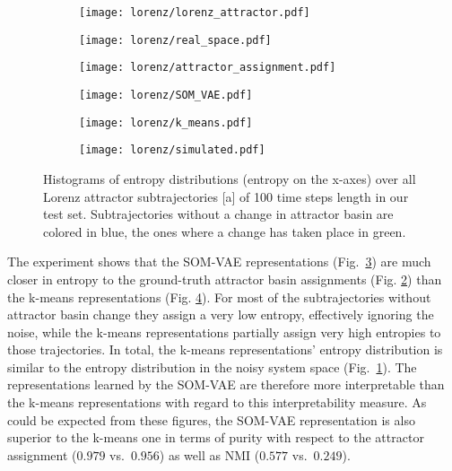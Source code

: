 \begin{figure}[h!]
    \centering
    \begin{subfigure}[t]{0.15\textwidth}
\centering
\texttt{[image: lorenz/lorenz\_attractor.pdf]}
\end{subfigure}
    \begin{subfigure}[t]{0.15\textwidth}
\centering
\texttt{[image: lorenz/real\_space.pdf]}
\label{fig:lorenz_real}
\end{subfigure}
    \begin{subfigure}[t]{0.15\textwidth}
\centering
\texttt{[image: lorenz/attractor\_assignment.pdf]}
\label{fig:lorenz_assignment}
\end{subfigure}
    \begin{subfigure}[t]{0.15\textwidth}
\centering
\texttt{[image: lorenz/SOM\_VAE.pdf]}
\label{fig:lorenz_somvae}
\end{subfigure}
    \begin{subfigure}[t]{0.15\textwidth}
\centering
\texttt{[image: lorenz/k\_means.pdf]}
\label{fig:lorenz_kmeans}
\end{subfigure}
    \begin{subfigure}[t]{0.15\textwidth}
\centering
\texttt{[image: lorenz/simulated.pdf]}
\label{fig:lorenz_simulated}
\end{subfigure}

    \caption{Histograms of entropy distributions (entropy on the x-axes) over all Lorenz attractor subtrajectories [a] of 100 time steps length in our test set. Subtrajectories without a change in attractor basin are colored in blue, the ones where a change has taken place in green.}
    \label{fig:lorenz}
\end{figure}

The experiment shows that the SOM-VAE representations (Fig.~\ref{fig:lorenz_somvae}) are much closer in entropy to the ground-truth attractor basin assignments (Fig. \ref{fig:lorenz_assignment}) than the k-means representations (Fig. \ref{fig:lorenz_kmeans}).
For most of the subtrajectories without attractor basin change they assign a very low entropy, effectively ignoring the noise, while the k-means representations partially assign very high entropies to those trajectories.
In total, the k-means representations' entropy distribution is similar to the entropy distribution in the noisy system space (Fig.~\ref{fig:lorenz_real}).
The representations learned by the SOM-VAE are therefore more interpretable than the k-means representations with regard to this interpretability measure.
As could be expected from these figures, the SOM-VAE representation is also superior to the k-means one in terms of purity with respect to the attractor assignment ($0.979$ vs.\ $0.956$) as well as NMI ($0.577$ vs.\ $0.249$).

